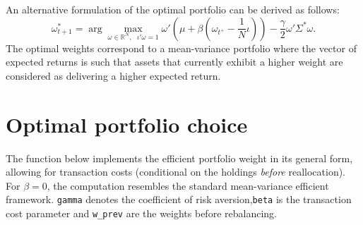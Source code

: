 \documentclass[
]{krantz}
\begin{document}
An alternative formulation of the optimal portfolio can be derived as follows:
\[\omega_{t+1} ^*=\arg\max_{\omega\in\mathbb{R}^N,\text{ }  \iota'\omega=1}
\omega'\left(\mu+\beta\left(\omega_{t^+} - \frac{1}{N}\iota\right)\right) - \frac{\gamma}{2}\omega'\Sigma^* \omega.\]
The optimal weights correspond to a mean-variance portfolio where the vector of expected returns is such that assets that currently exhibit a higher weight are considered as delivering a higher expected return.

\hypertarget{optimal-portfolio-choice}{%
\section{Optimal portfolio choice}\label{optimal-portfolio-choice}}

The function below implements the efficient portfolio weight in its general form, allowing for transaction costs (conditional on the holdings \emph{before} reallocation). For \(\beta=0\), the computation resembles the standard mean-variance efficient framework. \texttt{gamma} denotes the coefficient of risk aversion,\texttt{beta} is the transaction cost parameter and \texttt{w\_prev} are the weights before rebalancing.
\end{document}
